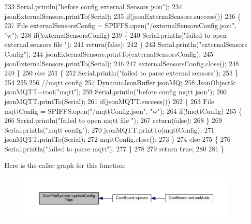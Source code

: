 \begin{DoxyCode}
233     Serial.println(\textcolor{stringliteral}{"before config external Sensors json"});
234     jsonExternalSensors.printTo(Serial);
235     \textcolor{keywordflow}{if}(jsonExternalSensors.success())
236     \{
237         File externalSensorsConfig = SPIFFS.open(\textcolor{stringliteral}{"/externalSensorsConfig.json"}, \textcolor{stringliteral}{"w"});   
238         \textcolor{keywordflow}{if}(!externalSensorsConfig)
239         \{
240             Serial.println(\textcolor{stringliteral}{"failed to open external sensors file "});
241             \textcolor{keywordflow}{return}(\textcolor{keyword}{false});
242         \}
243         Serial.println(\textcolor{stringliteral}{"externalSensors Config"});
244         jsonExternalSensors.printTo(externalSensorsConfig);
245         jsonExternalSensors.printTo(Serial);
246     
247         externalSensorsConfig.close();
248 
249     \}
250     \textcolor{keywordflow}{else}
251     \{
252         Serial.println(\textcolor{stringliteral}{"failed to parse external sensors"}); 
253     \}
254 
255     
256     \textcolor{comment}{//mqtt config}
257     DynamicJsonBuffer jsonMQ;
258         JsonObject& jsonMQTT=root[\textcolor{stringliteral}{"mqtt"}];
259     Serial.println(\textcolor{stringliteral}{"before config mqtt json"});
260     jsonMQTT.printTo(Serial);
261     \textcolor{keywordflow}{if}(jsonMQTT.success())
262     \{
263         File mqttConfig = SPIFFS.open(\textcolor{stringliteral}{"/mqttConfig.json"}, \textcolor{stringliteral}{"w"}); 
264         \textcolor{keywordflow}{if}(!mqttConfig)
265         \{
266             Serial.println(\textcolor{stringliteral}{"failed to open mqtt file "});        
267             \textcolor{keywordflow}{return}(\textcolor{keyword}{false});
268         \}
269         Serial.println(\textcolor{stringliteral}{"mqtt config"});
270         jsonMQTT.printTo(mqttConfig);
271         jsonMQTT.printTo(Serial);
272         mqttConfig.close();
273     \}
274     \textcolor{keywordflow}{else}
275     \{
276         Serial.println(\textcolor{stringliteral}{"failed to parse mqtt"}); 
277     \}   
278         
279     \textcolor{keywordflow}{return} \textcolor{keyword}{true};
280 
281 \}   
\end{DoxyCode}
Here is the caller graph for this function\+:
\nopagebreak
\begin{figure}[H]
\begin{center}
\leavevmode
\includegraphics[width=350pt]{classCoolFileSystem_a32dad79ae80182a83e2e8f52286b7c7b_icgraph}
\end{center}
\end{figure}


